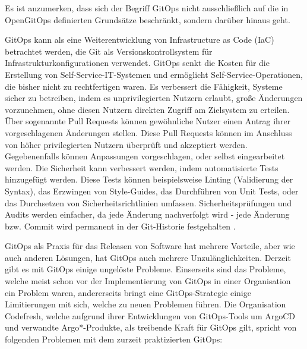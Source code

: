 Es ist anzumerken, dass sich der Begriff GitOps nicht ausschließlich auf
die in OpenGitOps definierten Grundsätze beschränkt,
sondern darüber hinaus geht.
\bigskip

GitOps kann als eine Weiterentwicklung von Infrastructure as Code (IaC) betrachtet werden, die Git als Versionskontrollsystem für Infrastrukturkonfigurationen verwendet.
GitOps senkt die Kosten für die Erstellung von Self-Service-IT-Systemen und ermöglicht Self-Service-Operationen, die bisher nicht zu rechtfertigen waren.
Es verbessert die Fähigkeit, Systeme sicher zu betreiben, indem es
unprivilegierten Nutzern erlaubt, große Änderungen vorzunehmen,
ohne diesen Nutzern direkten Zugriff am Zielsystem zu erteilen.
Über sogenannte Pull Requests können gewöhnliche Nutzer einen Antrag
ihrer vorgeschlagenen Änderungen stellen.
Diese Pull Requests können im Anschluss von höher privilegierten Nutzern
überprüft und akzeptiert werden.
Gegebenenfalls können Anpassungen vorgeschlagen, oder selbst eingearbeitet werden.
Die Sicherheit kann verbessert werden, indem automatisierte Tests hinzugefügt werden.
Diese Tests können beispielsweise
Linting (Validierung der Syntax),
das Erzwingen von Style-Guides,
das Durchführen von Unit Tests,
oder
das Durchsetzen von Sicherheitsrichtlinien
umfassen.
Sicherheitsprüfungen und Audits werden einfacher, 
da jede Änderung nachverfolgt wird -
jede Änderung bzw. Commit wird permanent in der Git-Historie festgehalten
\autocite{limoncelli_gitopsPathToMoreSelfService}.
\bigskip


GitOps als Praxis für das Releasen von Software hat mehrere Vorteile,
aber wie auch anderen Lösungen, hat GitOps auch mehrere Unzulänglichkeiten.
Derzeit gibt es mit GitOps einige ungelöste Probleme.
Einserseits sind das Probleme, welche meist schon 
vor der Implementierung von GitOps in einer Organisation ein Problem waren,
andererseits bringt eine GitOps-Strategie einige Limitierungen mit sich,
welche zu neuen Problemen führen.
Die Organisation Codefresh,
welche aufgrund ihrer Entwicklungen
von GitOps-Tools um ArgoCD und verwandte Argo*-Produkte,
als treibende Kraft für GitOps gilt,
spricht von folgenden Problemen mit dem zurzeit praktizierten GitOps:

